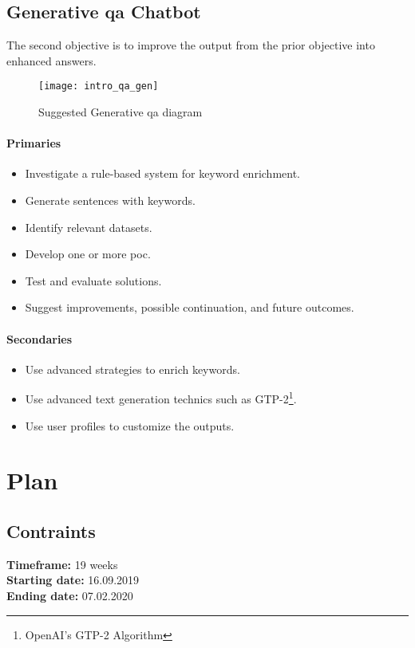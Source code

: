 \subsection{Generative \gls{qa} Chatbot}
The second objective is to improve the output from the prior objective into enhanced answers.
\begin{figure}[ht!]
    \centering
    \texttt{[image: intro\_qa\_gen]}
    \caption{Suggested Generative \gls{qa} diagram}
    \label{fig:intro_qa_gen}
\end{figure}

\paragraph{Primaries}
\begin{itemize}[noitemsep]
    \item Investigate a rule-based system for keyword enrichment.
    \item Generate sentences with keywords.
    \item Identify relevant datasets.
    \item Develop one or more \gls{poc}.
    \item Test and evaluate solutions.
    \item Suggest improvements, possible continuation, and future outcomes.
\end{itemize}
\paragraph{Secondaries}
\begin{itemize}[noitemsep]
    \item Use advanced strategies to enrich keywords.
    \item Use advanced text generation technics such as GTP-2\footnote{OpenAI's GTP-2 Algorithm\cite{papers:gpt2}}.
    \item Use user profiles to customize the outputs.
\end{itemize}


\section{Plan}
\label{plan:plan}
\subsection{Contraints}
\textbf{Timeframe:} 19 weeks\\
\textbf{Starting date:} 16.09.2019\\
\textbf{Ending date:} 07.02.2020


